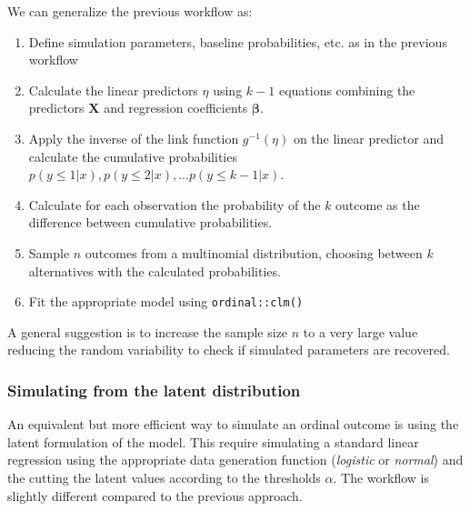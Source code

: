 \documentclass[
  man,floatsintext]{apa6}
\providecommand{\tightlist}{%
  \setlength{\itemsep}{0pt}\setlength{\parskip}{0pt}}
\begin{document}
\normalsize

We can generalize the previous workflow as:

\begin{enumerate}
\def\labelenumi{\arabic{enumi}.}
\tightlist
\item
  Define simulation parameters, baseline probabilities, etc. as in the previous workflow
\item
  Calculate the linear predictors \(\eta\) using \(k - 1\) equations combining the predictors \(\mathbf{X}\) and regression coefficients \(\boldsymbol{\beta}\).
\item
  Apply the inverse of the link function \(g^{-1}(\eta)\) on the linear predictor and calculate the cumulative probabilities \(p(y \leq 1|x), p(y \leq 2|x), ... p(y \leq k - 1|x)\).
\item
  Calculate for each observation the probability of the \(k\) outcome as the difference between cumulative probabilities.
\item
  Sample \(n\) outcomes from a multinomial distribution, choosing between \(k\) alternatives with the calculated probabilities.
\item
  Fit the appropriate model using \texttt{ordinal::clm()}
\end{enumerate}

A general suggestion is to increase the sample size \(n\) to a very large value reducing the random variability to check if simulated parameters are recovered.

\subsubsection{Simulating from the latent distribution}\label{simulating-from-the-latent-distribution}

An equivalent but more efficient way to simulate an ordinal outcome is using the latent formulation of the model. This require simulating a standard linear regression using the appropriate data generation function (\emph{logistic} or \emph{normal}) and the cutting the latent values according to the thresholds \(\alpha\). The workflow is slightly different compared to the previous approach.
\end{document}
